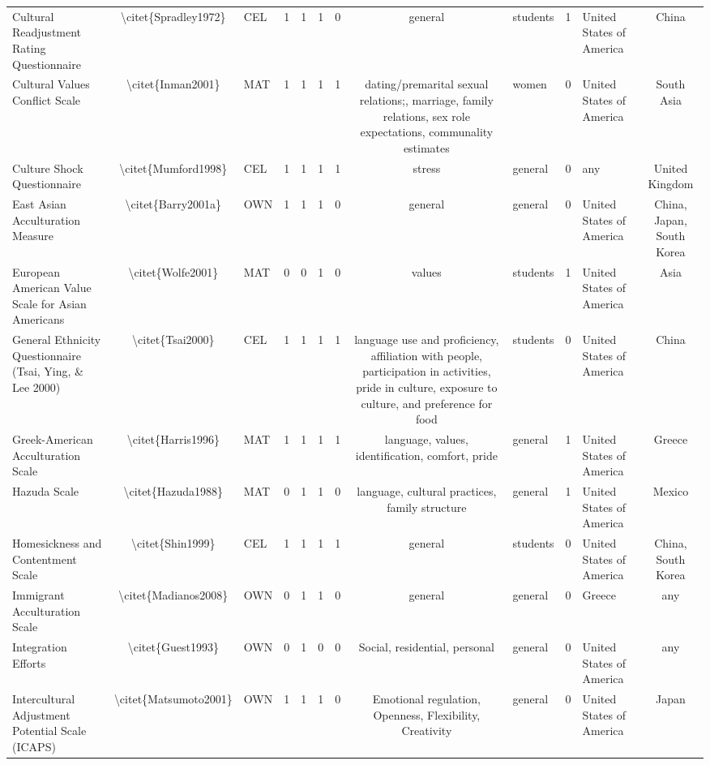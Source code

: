 \begin{longtable}[l]{lclclclclclc}
Cultural Readjustment Rating Questionnaire & \textbackslash{}citet\{Spradley1972\} & CEL & 1 & 1 & 1 & 0 & general & students & 1 & United States of America & China\\
Cultural Values Conflict Scale & \textbackslash{}citet\{Inman2001\} & MAT & 1 & 1 & 1 & 1 & dating/premarital sexual relations;, marriage, family relations, sex role expectations, communality estimates & women & 0 & United States of America & South Asia\\
Culture Shock Questionnaire & \textbackslash{}citet\{Mumford1998\} & CEL & 1 & 1 & 1 & 1 & stress & general & 0 & any & United Kingdom\\
East Asian Acculturation Measure & \textbackslash{}citet\{Barry2001a\} & OWN & 1 & 1 & 1 & 0 & general & general & 0 & United States of America & China, Japan, South Korea\\
European American Value Scale for Asian Americans & \textbackslash{}citet\{Wolfe2001\} & MAT & 0 & 0 & 1 & 0 & values & students & 1 & United States of America & Asia\\
General Ethnicity Questionnaire (Tsai, Ying, \& Lee 2000) & \textbackslash{}citet\{Tsai2000\} & CEL & 1 & 1 & 1 & 1 & language use and proficiency, affiliation with people, participation in activities, pride in culture, exposure to culture, and preference for food & students & 0 & United States of America & China\\
Greek-American Acculturation Scale & \textbackslash{}citet\{Harris1996\} & MAT & 1 & 1 & 1 & 1 & language, values, identification, comfort, pride & general & 1 & United States of America & Greece\\
Hazuda Scale & \textbackslash{}citet\{Hazuda1988\} & MAT & 0 & 1 & 1 & 0 & language, cultural practices, family structure & general & 1 & United States of America & Mexico\\
Homesickness and Contentment Scale & \textbackslash{}citet\{Shin1999\} & CEL & 1 & 1 & 1 & 1 & general & students & 0 & United States of America & China, South Korea\\
Immigrant Acculturation Scale & \textbackslash{}citet\{Madianos2008\} & OWN & 0 & 1 & 1 & 0 & general & general & 0 & Greece & any\\
Integration Efforts & \textbackslash{}citet\{Guest1993\} & OWN & 0 & 1 & 0 & 0 & Social, residential, personal & general & 0 & United States of America & any\\
Intercultural Adjustment Potential Scale (ICAPS) & \textbackslash{}citet\{Matsumoto2001\} & OWN & 1 & 1 & 1 & 0 & Emotional regulation, Openness, Flexibility, Creativity & general & 0 & United States of America & Japan\\

\end{longtable}
